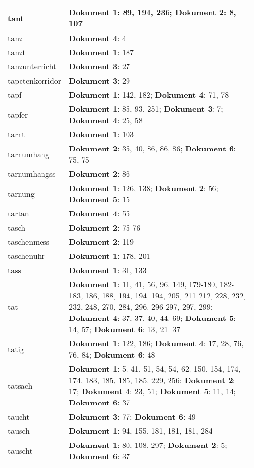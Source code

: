 \documentclass[a5paper]{article}
\begin{document}
\begin{longtable}[l]{|l|p{3in}|}
\hline
tant & \textbf{Dokument 1}: 89, 194, 236; \textbf{Dokument 2}: 8, 107 \\
\hline
tanz & \textbf{Dokument 4}: 4 \\
\hline
tanzt & \textbf{Dokument 1}: 187 \\
\hline
tanzunterricht & \textbf{Dokument 3}: 27 \\
\hline
tapetenkorridor & \textbf{Dokument 3}: 29 \\
\hline
tapf & \textbf{Dokument 1}: 142, 182; \textbf{Dokument 4}: 71, 78 \\
\hline
tapfer & \textbf{Dokument 1}: 85, 93, 251; \textbf{Dokument 3}: 7; \textbf{Dokument 4}: 25, 58 \\
\hline
tarnt & \textbf{Dokument 1}: 103 \\
\hline
tarnumhang & \textbf{Dokument 2}: 35, 40, 86, 86, 86; \textbf{Dokument 6}: 75, 75 \\
\hline
tarnumhangss & \textbf{Dokument 2}: 86 \\
\hline
tarnung & \textbf{Dokument 1}: 126, 138; \textbf{Dokument 2}: 56; \textbf{Dokument 5}: 15 \\
\hline
tartan & \textbf{Dokument 4}: 55 \\
\hline
tasch & \textbf{Dokument 2}: 75-76 \\
\hline
taschenmess & \textbf{Dokument 2}: 119 \\
\hline
taschenuhr & \textbf{Dokument 1}: 178, 201 \\
\hline
tass & \textbf{Dokument 1}: 31, 133 \\
\hline
tat & \textbf{Dokument 1}: 11, 41, 56, 96, 149, 179-180, 182-183, 186, 188, 194, 194, 194, 205, 211-212, 228, 232, 232, 248, 270, 284, 296, 296-297, 297, 299; \textbf{Dokument 4}: 37, 37, 40, 44, 69; \textbf{Dokument 5}: 14, 57; \textbf{Dokument 6}: 13, 21, 37 \\
\hline
tatig & \textbf{Dokument 1}: 122, 186; \textbf{Dokument 4}: 17, 28, 76, 76, 84; \textbf{Dokument 6}: 48 \\
\hline
tatsach & \textbf{Dokument 1}: 5, 41, 51, 54, 54, 62, 150, 154, 174, 174, 183, 185, 185, 185, 229, 256; \textbf{Dokument 2}: 17; \textbf{Dokument 4}: 23, 51; \textbf{Dokument 5}: 11, 14; \textbf{Dokument 6}: 37 \\
\hline
taucht & \textbf{Dokument 3}: 77; \textbf{Dokument 6}: 49 \\
\hline
tausch & \textbf{Dokument 1}: 94, 155, 181, 181, 181, 284 \\
\hline
tauscht & \textbf{Dokument 1}: 80, 108, 297; \textbf{Dokument 2}: 5; \textbf{Dokument 6}: 37 \\

\end{longtable}
\end{document}
